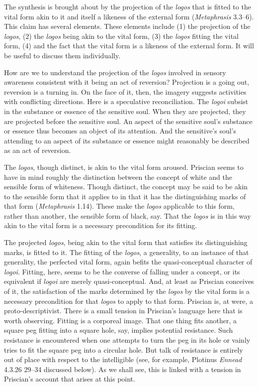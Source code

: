 \documentclass[12pt]{article}
\begin{document}
The synthesis is brought about by the projection of the \emph{logos} that is fitted to the vital form akin to it and itself a likeness of the external form (\emph{Metaphrasis} 3.3--6). This claim has several elements. These elements include (1) the projection of the \emph{logos}, (2) the \emph{logos} being akin to the vital form, (3) the \emph{logos} fitting the vital form, (4) and the fact that the vital form is a likeness of the external form. It will be useful to discuss them individually.

How are we to understand the projection of the \emph{logos} involved in sensory awareness consistent with it being an act of reversion? Projection is a going out, reversion is a turning in. On the face of it, then, the imagery suggests activities with conflicting directions. Here is a speculative reconciliation. The \emph{logoi} subsist in the substance or essence of the sensitive soul. When they are projected, they are projected before the sensitive soul. An aspect of the sensitive soul's substance or essence thus becomes an object of its attention. And the sensitive's soul's attending to an aspect of its substance or essence might reasonably be described as an act of reversion.

The \emph{logos}, though distinct, is akin to the vital form aroused. Priscian seems to have in mind roughly the distinction between the concept of white and the sensible form of whiteness. Though distinct, the concept may be said to be akin to the sensible form that it applies to in that it has the distinguishing marks of that form (\emph{Metaphrasis} 1.14). These make the \emph{logos} applicable to this form, rather than another, the sensible form of black, say. That the \emph{logos} is in this way akin to the vital form is a necessary precondition for its fitting.

The projected \emph{logos}, being akin to the vital form that satisfies its distinguishing marks, is fitted to it. The fitting of the \emph{logos}, a generality, to an instance of that generality, the perfected vital form, again befits the quasi-conceptual character of \emph{logoi}. Fitting, here, seems to be the converse of falling under a concept, or its equivalent if \emph{logoi} are merely quasi-conceptual. And, at least as Priscian conceives of it, the satisfaction of the marks determined by the \emph{logos} by the vital form is a necessary precondition for that \emph{logos} to apply to that form. Priscian is, at were, a proto-descriptivist. There is a small tension in Priscian's language here that is worth observing. Fitting is a corporeal image. That one thing fits another, a square peg fitting into a square hole, say, implies potential resistance. Such resistance is encountered when one attempts to turn the peg in its hole or vainly tries to fit the square peg into a circular hole. But talk of resistance is entirely out of place with respect to the intelligible (see, for example, Plotinus \emph{Ennead} 4.3.26 29–34 discussed below). As we shall see, this is linked with a tension in Priscian's account that arises at this point.
\end{document}
